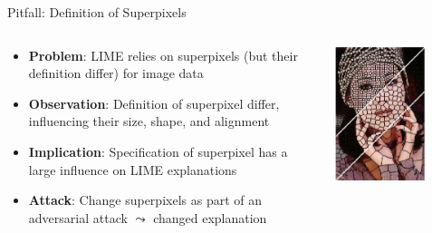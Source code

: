 \documentclass[10pt,compress,t,notes=noshow, xcolor=table]{beamer}
\begin{document}
\begin{frame}{Pitfall: Definition of Superpixels }

\begin{columns}[totalwidth=\textwidth]
    
    \begin{column}{0.6\textwidth}
        
        \begin{itemize}
        	\item \textbf{Problem}: LIME relies on superpixels (but their definition differ) for image data
        	\item \textbf{Observation}: Definition of superpixel differ, influencing their size, shape, and alignment 
        	\pause
        	\item \textbf{Implication}: Specification of superpixel has a large influence on LIME explanations 
        	\item \textbf{Attack}: Change superpixels as part of an adversarial attack $\leadsto$ changed explanation
        \end{itemize}
        
    \end{column}
    
    \begin{column}{0.4\textwidth}
    
        \centering
        \includegraphics[width=0.7\textwidth]{figure/superpixel_woman}
        
    \end{column}
    
\end{columns}

\end{frame}


\endlecture
\end{document}
